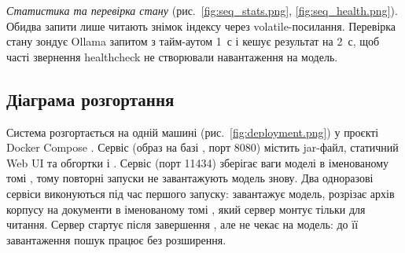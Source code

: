 
\textit{Статистика та перевірка стану} (рис.~\ref{fig:seq_stats.png},
\ref{fig:seq_health.png}). Обидва запити лише читають знімок індексу через volatile-посилання.
Перевірка стану зондує Ollama запитом  з тайм-аутом 1~с і кешує
результат на 2~с, щоб часті звернення healthcheck не створювали навантаження на модель.


\subsection{Діаграма розгортання}

Система розгортається на одній машині (рис.~\ref{fig:deployment.png}) у проєкті Docker
Compose . Сервіс  (образ на базі ,
порт 8080) містить jar-файл, статичний Web UI та обгортки  і .
Сервіс  (порт 11434) зберігає ваги моделі в іменованому томі ,
тому повторні запуски не завантажують модель знову. Два одноразові сервіси виконуються під
час першого запуску:  завантажує модель,  розрізає архів
корпусу на документи в іменованому томі , який сервер монтує тільки для
читання. Сервер стартує після завершення , але не чекає на модель: до її
завантаження пошук працює без розширення.


